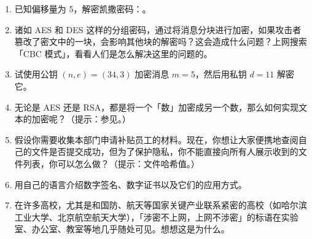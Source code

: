 \practice

\begin{enumerate}
  \item 已知偏移量为 5，解密凯撒密码：。
  \item 诸如 AES 和 DES 这样的分组密码，通过将消息分块进行加密，如果攻击者篡改了密文中的一块，会影响其他块的解密吗？这会造成什么问题？上网搜索「CBC 模式」，看看人们是怎么解决这里的问题的。
  \item 试使用公钥 $(n,e)=(34, 3)$ 加密消息 $m=5$，然后用私钥 $d=11$ 解密它。
  \item 无论是 AES 还是 RSA，都是将一个「数」加密成另一个数，那么如何实现文本的加密呢？（提示：参见。）
  \item 假设你需要收集本部门申请补贴员工的材料。现在，你想让大家便携地查阅自己的文件是否提交成功，但为了保护隐私，你不能直接向所有人展示收到的文件列表，你可以怎么做？（提示：文件哈希值。）
  \item 用自己的语言介绍数字签名、数字证书以及它们的应用方式。
  \item 在许多高校，尤其是和国防、航天等国家关键产业联系紧密的高校（如哈尔滨工业大学、北京航空航天大学），「涉密不上网，上网不涉密」的标语在实验室、办公室、教室等地几乎随处可见。想想这是为什么。
\end{enumerate}
